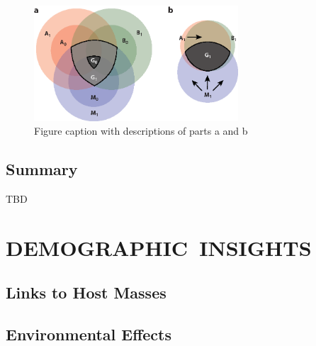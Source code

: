 \documentclass[a4paper]{ar-1col}
\begin{document}
 

\begin{figure}[h]
\includegraphics[width=3in]{SampleFigure}
\caption{Figure caption with descriptions of parts a and b}
\label{fig:continuumstuff}
\end{figure}


\begin{textbox}[h]\section{Summary}
TBD  
\end{textbox}





\section{DEMOGRAPHIC\ INSIGHTS} \label{sec:demographics}

\subsection{Links to Host Masses}

\subsection{Environmental Effects}
\end{document}
